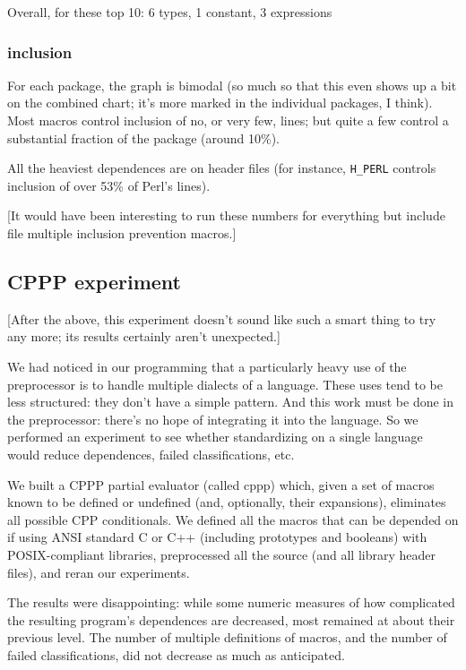 \documentclass[10pt]{article}
\begin{document}
        Overall, for these top 10:  6 types, 1 constant, 3 expressions

   \subsubsection{inclusion}

        For each package, the graph is bimodal (so much so that this even
          shows up a bit on the combined chart; it's more marked in the
          individual packages, I think).  Most macros control inclusion of
          no, or very few, lines; but quite a few control a substantial
          fraction of the package (around 10\%).

        All the heaviest dependences are on header files (for instance,
          \verb|H_PERL| controls inclusion of over 53\% of Perl's lines).

        [It would have been interesting to run these numbers for everything
          but include file multiple inclusion prevention macros.]


\subsection{CPPP experiment}

    [After the above, this experiment doesn't sound like such a smart thing
      to try any more; its results certainly aren't unexpected.]

    We had noticed in our programming that a particularly heavy use of the
      preprocessor is to handle multiple dialects of a language.  These uses
      tend to be less structured:  they don't have a simple pattern.  And
      this work must be done in the preprocessor:  there's no hope of
      integrating it into the language.  So we performed an experiment to
      see whether standardizing on a single language would reduce
      dependences, failed classifications, etc.

    We built a CPPP partial evaluator (called cppp) which, given a set of
      macros known to be defined or undefined (and, optionally, their
      expansions), eliminates all possible CPP conditionals.  We defined
      all the macros that can be depended on if using ANSI standard C or
      C++ (including prototypes and booleans) with POSIX-compliant
      libraries, preprocessed all the source (and 
      all library header files), and reran our experiments.

    The results were disappointing:  while some numeric measures of how
      complicated the resulting program's dependences are decreased, most
      remained at about their previous level.  The number of multiple
      definitions of macros, and the number of failed classifications, did
      not decrease as much as anticipated.
\end{document}
